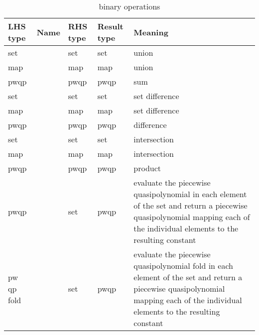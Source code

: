 \begin{table}
\begin{tabular}{llllp{}}
LHS type & Name & RHS type & Result type & Meaning
\\
\hline
set & \ai{$+$} & set & set & union
\\
map & \ai{$+$} & map & map & union
\\
pwqp & \ai{$+$} & pwqp & pwqp & sum
\\
set & \ai{$-$} & set & set & set difference
\\
map & \ai{$-$} & map & map & set difference
\\
pwqp & \ai{$-$} & pwqp & pwqp & difference
\\
set & \ai{$*$} & set & set & intersection
\\
map & \ai{$*$} & map & map & intersection
\\
pwqp & \ai{$*$} & pwqp & pwqp & product
\\
pwqp & \ai{@} & set & pwqp &
evaluate the piecewise quasipolynomial in each element
of the set and return a piecewise quasipolynomial
mapping each of the individual elements to the resulting
constant
\\
pw qp fold & \ai{@} & set & pwqp &
evaluate the piecewise quasipolynomial fold in each element
of the set and return a piecewise quasipolynomial
mapping each of the individual elements to the resulting
constant
\\
\end{tabular}
\caption{\protect{} binary operations}
\label{t:iscc:binary}
\end{table}
